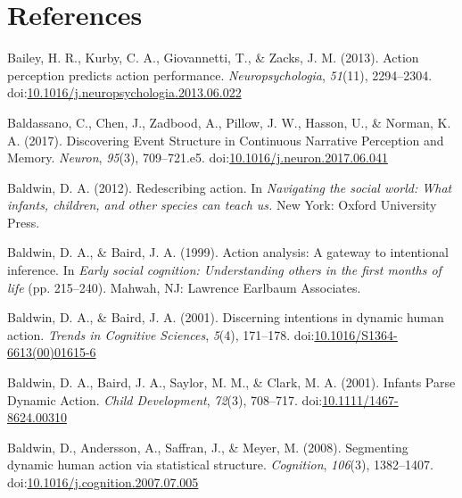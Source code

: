 \documentclass[
  english,
  man,floatsintext]{apa6}
\newlength{\cslhangindent}
\newenvironment{cslreferences}%
  {\setlength{\parindent}{0pt}%
  \everypar{\setlength{\hangindent}{\cslhangindent}}\ignorespaces}%
  {\par}
\begin{document}
\newpage

\hypertarget{references}{%
\section{References}\label{references}}

\begingroup
\setlength{\parindent}{-0.5in}
\setlength{\leftskip}{0.5in}

\hypertarget{refs}{}
\begin{cslreferences}
\leavevmode\hypertarget{ref-bailey_2013}{}%
Bailey, H. R., Kurby, C. A., Giovannetti, T., \& Zacks, J. M. (2013). Action perception predicts action performance. \emph{Neuropsychologia}, \emph{51}(11), 2294--2304. doi:\href{https://doi.org/10.1016/j.neuropsychologia.2013.06.022}{10.1016/j.neuropsychologia.2013.06.022}

\leavevmode\hypertarget{ref-baldassano_2017}{}%
Baldassano, C., Chen, J., Zadbood, A., Pillow, J. W., Hasson, U., \& Norman, K. A. (2017). Discovering Event Structure in Continuous Narrative Perception and Memory. \emph{Neuron}, \emph{95}(3), 709--721.e5. doi:\href{https://doi.org/10.1016/j.neuron.2017.06.041}{10.1016/j.neuron.2017.06.041}

\leavevmode\hypertarget{ref-baldwin_2012}{}%
Baldwin, D. A. (2012). Redescribing action. In \emph{Navigating the social world: What infants, children, and other species can teach us.} New York: Oxford University Press.

\leavevmode\hypertarget{ref-baldwin_baird_1999}{}%
Baldwin, D. A., \& Baird, J. A. (1999). Action analysis: A gateway to intentional inference. In \emph{Early social cognition: Understanding others in the first months of life} (pp. 215--240). Mahwah, NJ: Lawrence Earlbaum Associates.

\leavevmode\hypertarget{ref-baldwin_baird_2001}{}%
Baldwin, D. A., \& Baird, J. A. (2001). Discerning intentions in dynamic human action. \emph{Trends in Cognitive Sciences}, \emph{5}(4), 171--178. doi:\href{https://doi.org/10.1016/S1364-6613(00)01615-6}{10.1016/S1364-6613(00)01615-6}

\leavevmode\hypertarget{ref-baldwin_2001}{}%
Baldwin, D. A., Baird, J. A., Saylor, M. M., \& Clark, M. A. (2001). Infants Parse Dynamic Action. \emph{Child Development}, \emph{72}(3), 708--717. doi:\href{https://doi.org/10.1111/1467-8624.00310}{10.1111/1467-8624.00310}

\leavevmode\hypertarget{ref-baldwin_2008}{}%
Baldwin, D., Andersson, A., Saffran, J., \& Meyer, M. (2008). Segmenting dynamic human action via statistical structure. \emph{Cognition}, \emph{106}(3), 1382--1407. doi:\href{https://doi.org/10.1016/j.cognition.2007.07.005}{10.1016/j.cognition.2007.07.005}


\end{cslreferences}
\end{document}
